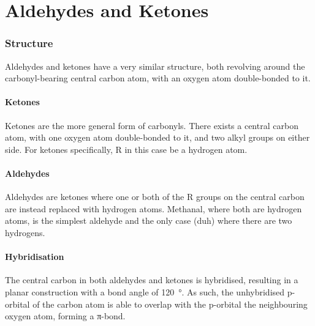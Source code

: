 
\pagebreak
\hypertarget{ChapterAldehydesAndKetones}{}
\part{Aldehydes and Ketones}

	\section{Structure}

		Aldehydes and ketones have a very similar structure, both revolving around the carbonyl-bearing central carbon atom, with an
		oxygen atom double-bonded to it.

		\subsection{Ketones}

			Ketones are the more general form of carbonyls. There exists a central carbon atom, with one oxygen atom double-bonded to it, and
			two alkyl groups on either side. For ketones specifically, R in this case  be a hydrogen atom.



		\subsection{Aldehydes}

			Aldehydes are ketones where one or both of the R groups on the central carbon are instead replaced with hydrogen atoms. Methanal,
			where both are hydrogen atoms, is the simplest aldehyde and the only case (duh) where there are two hydrogens.



		\pagebreak
		\subsection{Hybridisation}

			The central carbon in both aldehydes and ketones is \sptwo hybridised, resulting in a planar construction with a bond angle
			of \SI{120}{\degree}. As such, the unhybridised p-orbital of the carbon atom is able to overlap with the p-orbital the neighbouring
			oxygen atom, forming a π-bond.

